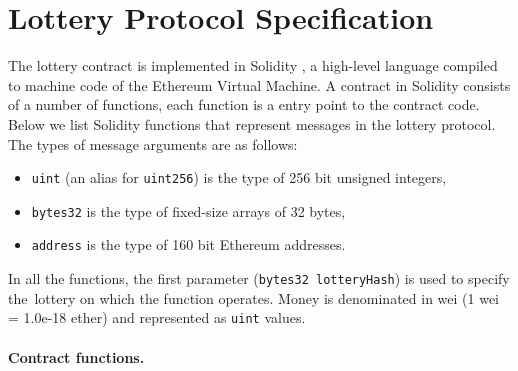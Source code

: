 \documentclass[a4paper]{article}
\begin{document}
\section{Lottery Protocol Specification}
\label{sec:lottery-protocol}
    The lottery contract is implemented in Solidity \cite{SOLIDITY}, a high-level language compiled to machine code of
    the Ethereum Virtual Machine\cite{ETHERDEV}. A contract in Solidity consists of a number of functions, each
    function is a entry point to the contract code. Below we list Solidity functions that represent messages in the
    lottery protocol. The types of message arguments are as follows:
    \begin{itemize}
        \item \texttt{uint} (an alias for \texttt{uint256}) is the type of 256 bit unsigned integers,
        \item \texttt{bytes32} is the type of fixed-size arrays of 32 bytes,
        \item \texttt{address} is the type of 160 bit Ethereum addresses.
    \end{itemize}
    In all the functions, the first parameter (\texttt{bytes32 lotteryHash}) is used to specify the~lottery on which
    the function operates. Money is denominated in wei (1 wei = 1.0e-18 ether) and represented as \texttt{uint} values.

    \paragraph{Contract functions.}
\end{document}
